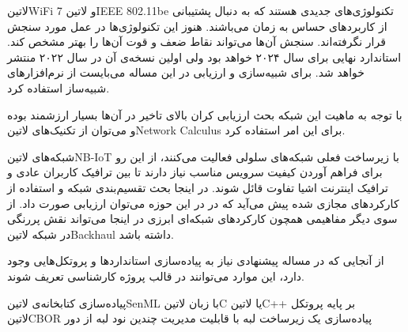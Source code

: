 
‌لاتین{WiFi 7} و ‌لاتین{IEEE 802.11be} تکنولوژی‌های جدیدی هستند که به دنبال پشتیبانی از کاربردهای حساس به زمان می‌باشند. هنوز این تکنولوژی‌ها در عمل مورد سنجش قرار نگرفته‌اند.
سنجش آن‌ها می‌تواند نقاط ضعف و قوت آن‌ها را بهتر مشخص کند. استاندارد نهایی برای سال ۲۰۲۴ خواهد بود ولی اولین نسخه‌ی آن در سال ۲۰۲۲ منتشر خواهد شد. برای شبیه‌سازی و ارزیابی در این
مساله می‌بایست از نرم‌افزارهای شبیه‌ساز استفاده کرد.

با توجه به ماهیت این شبکه بحث ارزیابی کران بالای تاخیر در آن‌ها بسیار ارزشمند بوده و می‌توان از تکنیک‌های ‌لاتین{Network Calculus} برای این امر استفاده کرد.


شبکه‌های ‌لاتین{NB-IoT} با زیرساخت فعلی شبکه‌های سلولی فعالیت می‌کنند، از این رو برای فراهم آوردن کیفیت سرویس مناسب نیاز دارند تا بین ترافیک کاربران عادی
و ترافیک اینترنت اشیا تفاوت قائل شوند. در اینجا بحث تقسیم‌بندی شبکه و استفاده از کارکردهای مجازی شده پیش می‌آید که در در این حوزه می‌توان ارزیابی صورت داد.
از سوی دیگر مفاهیمی همچون کارکردهای شبکه‌ای ابرزی در اینجا می‌تواند نقش پررنگی در شبکه ‌لاتین{Backhaul} داشته باشد.


از آنجایی که در مساله پیشنهادی نیاز به پیاده‌سازی استانداردها و پروتکل‌هایی وجود دارد، این موارد می‌توانند در قالب پروژه کارشناسی تعریف شوند.

 پیاده‌سازی کتابخانه‌ی ‌لاتین{SenML} با زبان ‌لاتین{C} یا ‌لاتین{C++} بر پایه پروتکل ‌لاتین{CBOR}
 پیاده‌سازی یک زیرساخت لبه با قابلیت مدیریت چندین نود لبه از دور


